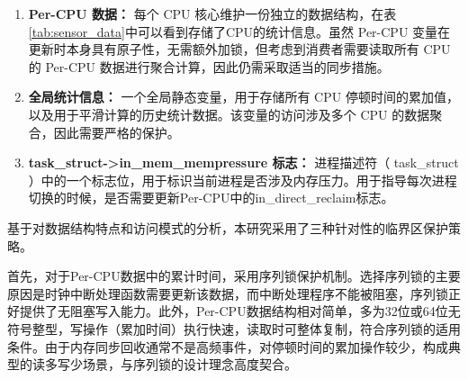 \begin{enumerate}
    \item \textbf{Per-CPU 数据：} 每个 CPU 核心维护一份独立的数据结构，在表\ref{tab:sensor_data}中可以看到存储了CPU的统计信息。虽然 Per-CPU 变量在更新时本身具有原子性，无需额外加锁，但考虑到消费者需要读取所有 CPU 的 Per-CPU 数据进行聚合计算，因此仍需采取适当的同步措施。

    \item \textbf{全局统计信息：} 一个全局静态变量，用于存储所有 CPU 停顿时间的累加值，以及用于平滑计算的历史统计数据。该变量的访问涉及多个 CPU 的数据聚合，因此需要严格的保护。

    \item \textbf{ task\_struct->in\_mem\_mempressure  标志：} 进程描述符（ task\_struct ）中的一个标志位，用于标识当前进程是否涉及内存压力。用于指导每次进程切换的时候，是否需要更新Per-CPU中的in\_direct\_reclaim标志。
\end{enumerate}



基于对数据结构特点和访问模式的分析，本研究采用了三种针对性的临界区保护策略。

首先，对于Per-CPU数据中的累计时间，采用序列锁保护机制。选择序列锁的主要原因是时钟中断处理函数需要更新该数据，而中断处理程序不能被阻塞，序列锁正好提供了无阻塞写入能力。此外，Per-CPU数据结构相对简单，多为32位或64位无符号整型，写操作（累加时间）执行快速，读取时可整体复制，符合序列锁的适用条件。由于内存同步回收通常不是高频事件，对停顿时间的累加操作较少，构成典型的读多写少场景，与序列锁的设计理念高度契合。


